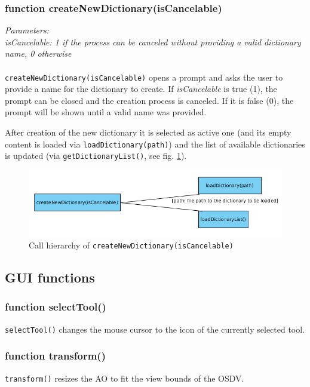 \subsubsection{function createNewDictionary(isCancelable)}
\emph{Parameters:\\
	isCancelable: 1 if the process can be canceled without providing a valid dictionary name, 0 otherwise\\ \\
}
\texttt{createNewDictionary(isCancelable)} opens a prompt and asks the user to provide a name for the dictionary to create. If \emph{isCancelable} is true (1), the prompt can be closed and the creation process is canceled. If it is false (0), the prompt will be shown until a valid name was provided.

After creation of the new dictionary it is selected as active one (and its empty content is loaded via \texttt{loadDictionary(path)}) and the list of available dictionaries is updated (via \texttt{getDictionaryList()}, see fig. \ref{figB_createDict}).

\begin{figure}[H]
	\begin{center}
		\includegraphics[scale=0.45]{img/ch_createDict.png}
		\caption{Call hierarchy of \texttt{createNewDictionary(isCancelable)}}
		\label{figB_createDict}
	\end{center}
\end{figure}


\subsection{GUI functions}

\subsubsection{function selectTool()}
\texttt{selectTool()} changes the mouse cursor to the icon of the currently selected tool.


\subsubsection{function transform()}
\texttt{transform()} resizes the AO to fit the view bounds of the OSDV.


